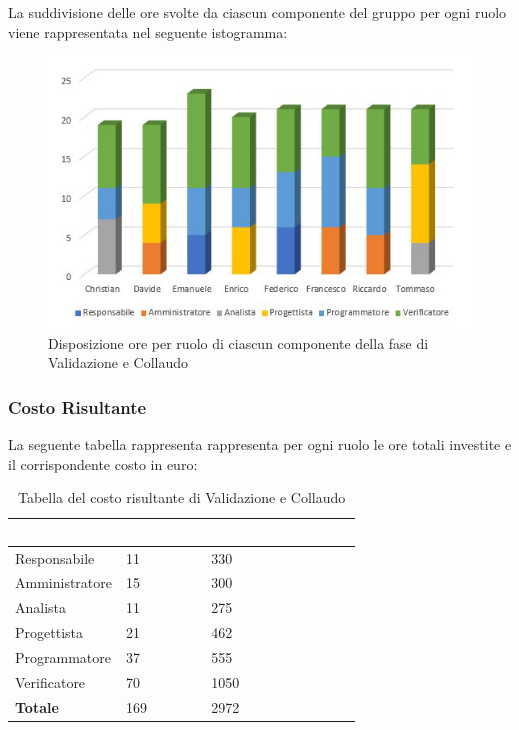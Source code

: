 La suddivisione delle ore svolte da ciascun componente del gruppo per ogni ruolo viene rappresentata nel seguente istogramma:
\begin{figure}[h]
	\centering
	\includegraphics[scale=2.8]{Sezioni/Istogrammi/IstogrammaValidazione.png}
	\caption{Disposizione ore per ruolo di ciascun componente della fase di Validazione e Collaudo}
\end{figure}

\clearpage

\subsubsection{Costo Risultante}
La seguente tabella rappresenta rappresenta per ogni ruolo le ore totali investite e il corrispondente costo in euro:
{
\renewcommand{\arraystretch}{2}
\centering
\begin{longtable}[h!]	{ C{3cm} C{2cm} C{4cm}}
\caption{Tabella del costo risultante di Validazione e Collaudo}\\

\textcolor{white}{\textbf{Ruolo}} & 
\textcolor{white}{\textbf{Totale ore}} & 
\textcolor{white}{\textbf{Costo ruolo in euro}}\\	
\endhead
        
Responsabile    &  11 &  330 \\
Amministratore  &  15 &  300 \\
Analista        &  11 &  275 \\
Progettista     &  21 &  462 \\
Programmatore   &  37 &  555 \\
Verificatore    &  70 & 1050 \\
\textbf{Totale} & 169 & 2972 \\
	
\end{longtable}
}

